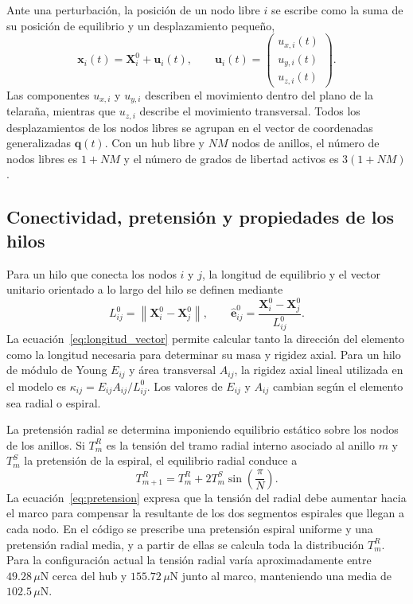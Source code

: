 \documentclass[11pt,letterpaper]{article}
\newcommand{\uN}{\,\mu\mathrm{N}}
\begin{document}
Ante una perturbación, la posición de un nodo libre $i$ se escribe como la suma de su posición de equilibrio y un desplazamiento pequeño,
\begin{equation}
\mathbf{x}_i(t)=\mathbf{X}^{0}_i+\mathbf{u}_i(t),
\qquad
\mathbf{u}_i(t)=
\begin{pmatrix}
u_{x,i}(t)\\u_{y,i}(t)\\u_{z,i}(t)
\end{pmatrix}.
\label{eq:desplazamiento}
\end{equation}
Las componentes $u_{x,i}$ y $u_{y,i}$ describen el movimiento dentro del plano de la telaraña, mientras que $u_{z,i}$ describe el movimiento transversal. Todos los desplazamientos de los nodos libres se agrupan en el vector de coordenadas generalizadas $\mathbf{q}(t)$. Con un hub libre y $NM$ nodos de anillos, el número de nodos libres es $1+NM$ y el número de grados de libertad activos es $3(1+NM)$.

\subsection{Conectividad, pretensión y propiedades de los hilos}

Para un hilo que conecta los nodos $i$ y $j$, la longitud de equilibrio y el vector unitario orientado a lo largo del hilo se definen mediante
\begin{equation}
L_{ij}^{0}=\left\|\mathbf{X}^{0}_i-\mathbf{X}^{0}_j\right\|,
\qquad
\hat{\mathbf e}_{ij}^{0}=\frac{\mathbf{X}^{0}_i-\mathbf{X}^{0}_j}{L_{ij}^{0}}.
\label{eq:longitud_vector}
\end{equation}
La ecuación~\eqref{eq:longitud_vector} permite calcular tanto la dirección del elemento como la longitud necesaria para determinar su masa y rigidez axial. Para un hilo de módulo de Young $E_{ij}$ y área transversal $A_{ij}$, la rigidez axial lineal utilizada en el modelo es $\kappa_{ij}=E_{ij}A_{ij}/L_{ij}^{0}$. Los valores de $E_{ij}$ y $A_{ij}$ cambian según el elemento sea radial o espiral.

La pretensión radial se determina imponiendo equilibrio estático sobre los nodos de los anillos. Si $T_m^R$ es la tensión del tramo radial interno asociado al anillo $m$ y $T_m^S$ la pretensión de la espiral, el equilibrio radial conduce a
\begin{equation}
T_{m+1}^{R}=T_m^{R}+2T_m^{S}\sin\left(\frac{\pi}{N}\right).
\label{eq:pretension}
\end{equation}
La ecuación~\eqref{eq:pretension} expresa que la tensión del radial debe aumentar hacia el marco para compensar la resultante de los dos segmentos espirales que llegan a cada nodo. En el código se prescribe una pretensión espiral uniforme y una pretensión radial media, y a partir de ellas se calcula toda la distribución $T_m^R$. Para la configuración actual la tensión radial varía aproximadamente entre $49.28\uN$ cerca del hub y $155.72\uN$ junto al marco, manteniendo una media de $102.5\uN$.
\end{document}
